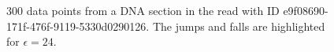 \begin{figure}
\centering

	\caption[300 data points from a DNA section in the read with ID e9f08690-171f-476f-9119-5330d0290126.]{\label{fig:epsilon-25}300 data points from a DNA section in the read with ID e9f08690-171f-476f-9119-5330d0290126. The jumps and falls are highlighted for $\epsilon=24$.}
\end{figure}

